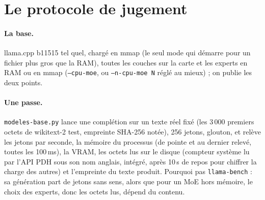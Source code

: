 \section{Le protocole de jugement}\label{sec:protocole-jugement}

\paragraph{La base.} llama.cpp b11515 tel quel, chargé en mmap (le seul mode qui démarre pour un fichier plus gros que la RAM), toutes les couches sur la carte et les experts en RAM ou en mmap (\texttt{--cpu-moe}, ou \texttt{--n-cpu-moe N} réglé au mieux) ; on publie les deux points.

\paragraph{Une passe.} \texttt{modeles-base.py} lance une complétion sur un texte réel fixé (les 3\,000 premiers octets de wikitext-2 test, empreinte SHA-256 notée), 256 jetons, glouton, et relève les jetons par seconde, la mémoire du processus (de pointe et au dernier relevé, toutes les 100\,ms), la VRAM, les octets lus sur le disque (compteur système lu par l'API PDH sous son nom anglais, intégré, après 10\,s de repos pour chiffrer la charge des autres) et l'empreinte du texte produit. Pourquoi pas \texttt{llama-bench} : sa génération part de jetons sans sens, alors que pour un MoE hors mémoire, le choix des experts, donc les octets lus, dépend du contenu.

